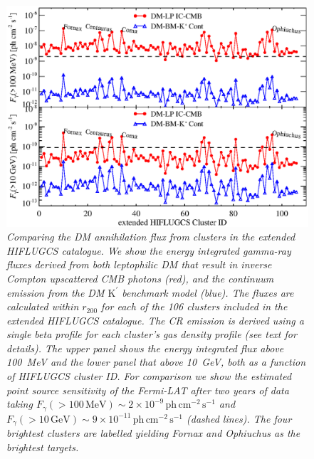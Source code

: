 \documentclass[10pt,aps,pra,reprint,amsmath,amsfonts,amssymb,showpacs,nofootinbib,floatfix]{revtex4-1}
\newcommand{\Fermi}{{\em Fermi}\xspace}
\newcommand{\rmn}{\mathrm}
\newcommand{\Kp}{\rmn{K}^\prime}
\newcommand{\rvir}{r_{200}}
\begin{document}
\begin{figure}%
\begin{minipage}{2.0\columnwidth}
 \includegraphics[width=0.99\columnwidth]{figures/Flux.comp.DM.eps}
 \caption{\it Comparing the DM annihilation flux from clusters in the
   extended HIFLUGCS catalogue. We show the energy integrated
   gamma-ray fluxes derived from both leptophilic DM that result in
   inverse Compton upscattered CMB photons (red), and the continuum
   emission from the DM $\Kp$ benchmark model (blue). The fluxes are
   calculated within $\rvir$ for each of the 106 clusters included in
   the extended HIFLUGCS catalogue. The CR emission is derived using a
   single beta profile for each cluster's gas density profile (see
   text for details). The upper panel shows the energy integrated flux
   above 100~MeV and the lower panel that above 10~GeV, both as a
   function of HIFLUGCS cluster ID. For comparison we show the
   estimated point source sensitivity of the \Fermi-LAT after two years
   of data taking $F_\gamma(>100\,\rmn{MeV})\sim
   2\times10^{-9}\,\rmn{ph}\, \rmn{cm}^{-2}\,\rmn{s}^{-1}$ and
   $F_\gamma(>10\,\rmn{GeV})\sim 9\times10^{-11}\,\rmn{ph}\,
   \rmn{cm}^{-2}\,\rmn{s}^{-1}$ (dashed lines). The four brightest
   clusters are labelled yielding Fornax and Ophiuchus as the
   brightest targets.}
 \label{fig21}
\end{minipage}
\end{figure}
\end{document}
